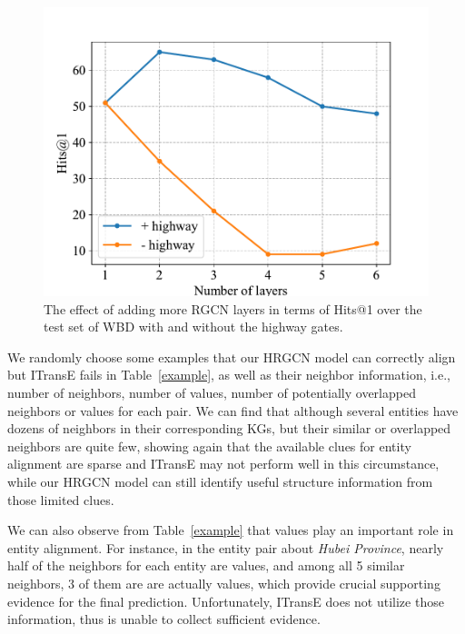 	\begin{figure}
		\begin{center}
			\includegraphics[width=1\linewidth]{graph3.pdf}
			\caption{The effect of adding more RGCN layers in terms of Hits@1 over the test set of WBD with and without the highway gates.}
			\label{highway}
		\end{center}
	\end{figure}
	We randomly choose some examples that our HRGCN model can correctly align but ITransE fails in Table~\ref{example}, as well as their neighbor information, i.e., number of neighbors, number of values, number of potentially overlapped neighbors or values for each pair. 
	We can find that although several entities have dozens of neighbors in their corresponding KGs, but their similar or overlapped neighbors are quite few, showing again that 
	the available clues for entity alignment are sparse and ITransE may not perform well in this circumstance, while our HRGCN model can still identify useful structure information from those limited clues. 
	
	We can also observe from Table~\ref{example} that values play an important role in entity alignment. 
	For instance, in the entity pair about \textit{Hubei Province}, nearly half of the neighbors for each entity are values, and among all 5 similar neighbors, 3 of them are are actually values,
	which provide crucial supporting evidence for the final prediction. Unfortunately, ITransE does not utilize those information, thus is unable to collect sufficient evidence.

